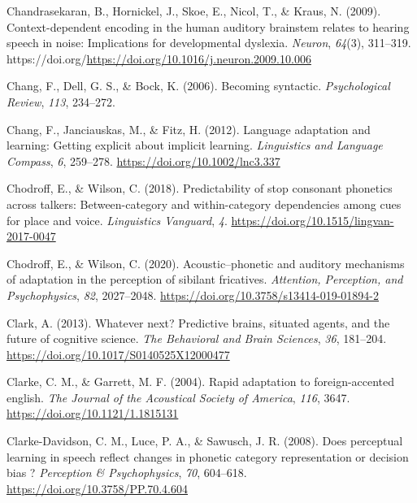 \documentclass[
  11pt,
  english,
  man,floatsintext]{apa6}
\newlength{\cslhangindent}
\newlength{\cslentryspacingunit} %
\newenvironment{CSLReferences}[2] %
 {%
  \setlength{\parindent}{0pt}
  \ifodd #1
  \let\oldpar\par
  \def\par{\hangindent=\cslhangindent\oldpar}
  \fi
  \setlength{\parskip}{#2\cslentryspacingunit}
 }%
 {}
\begin{document}
\begin{CSLReferences}{1}{0}
\leavevmode{}%
Chandrasekaran, B., Hornickel, J., Skoe, E., Nicol, T., \& Kraus, N. (2009). Context-dependent encoding in the human auditory brainstem relates to hearing speech in noise: Implications for developmental dyslexia. \emph{Neuron}, \emph{64}(3), 311--319. https://doi.org/\url{https://doi.org/10.1016/j.neuron.2009.10.006}

\leavevmode{}%
Chang, F., Dell, G. S., \& Bock, K. (2006). Becoming syntactic. \emph{Psychological Review}, \emph{113}, 234--272.

\leavevmode{}%
Chang, F., Janciauskas, M., \& Fitz, H. (2012). Language adaptation and learning: Getting explicit about implicit learning. \emph{Linguistics and Language Compass}, \emph{6}, 259--278. \url{https://doi.org/10.1002/lnc3.337}

\leavevmode{}%
Chodroff, E., \& Wilson, C. (2018). Predictability of stop consonant phonetics across talkers: Between-category and within-category dependencies among cues for place and voice. \emph{Linguistics Vanguard}, \emph{4}. \url{https://doi.org/10.1515/lingvan-2017-0047}

\leavevmode{}%
Chodroff, E., \& Wilson, C. (2020). Acoustic--phonetic and auditory mechanisms of adaptation in the perception of sibilant fricatives. \emph{Attention, Perception, and Psychophysics}, \emph{82}, 2027--2048. \url{https://doi.org/10.3758/s13414-019-01894-2}

\leavevmode{}%
Clark, A. (2013). Whatever next? Predictive brains, situated agents, and the future of cognitive science. \emph{The Behavioral and Brain Sciences}, \emph{36}, 181--204. \url{https://doi.org/10.1017/S0140525X12000477}

\leavevmode{}%
Clarke, C. M., \& Garrett, M. F. (2004). Rapid adaptation to foreign-accented english. \emph{The Journal of the Acoustical Society of America}, \emph{116}, 3647. \url{https://doi.org/10.1121/1.1815131}

\leavevmode{}%
Clarke-Davidson, C. M., Luce, P. A., \& Sawusch, J. R. (2008). Does perceptual learning in speech reflect changes in phonetic category representation or decision bias ? \emph{Perception \& Psychophysics}, \emph{70}, 604--618. \url{https://doi.org/10.3758/PP.70.4.604}


\end{CSLReferences}
\end{document}

